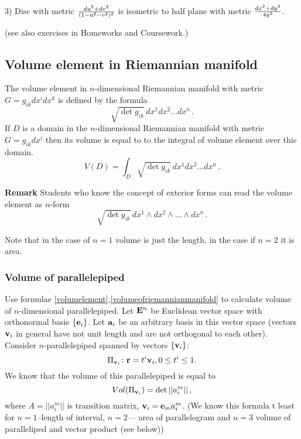\documentclass[12pt]{article}
\theoremstyle{theorem}
\numberwithin{equation}{section}
\begin{document}
{    3) Disc with metric $du^2+dv^2\over (1-u^2-v^2)^2$ is isometric to half plane with metric $dx^2+dy^2\over 4y^2$.

(see also exercises in Homeworks and Coursework.)





    \subsection {Volume element in Riemannian manifold}

   The volume element
in $n$-dimensional Riemannian manifold with metric $G=g_{ik}dx^i
    dx^k$ is defined by the formula
     \begin{equation}\label{volumelement}
  \sqrt {\det g_{ik}}\,dx^1dx^2\dots dx^n\,.
\end{equation}
    If $D$ is a domain in the $n$-dimensional Riemannian manifold with metric
    $G=g_{ik}dx^i$
    then its volume is equal to to the integral of volume element over this domain.
          \begin{equation}\label{volumeofriemannianmanifold}
  V(D)=\int_D \sqrt {\det g_{ik}}\,dx^1dx^2\dots dx^n\,.
\end{equation}

{\bf Remark} Students who know the concept of exterior forms
 can read the volume element as $n$-form
     \begin{equation*}\label{volumelement2}
  \sqrt {\det g_{ik}}\,dx^1\wedge dx^2\wedge \dots \wedge dx^n\,.
\end{equation*}

\bigskip

     Note that in the case of $n=1$ volume is just the length, in the case
     if $n=2$ it is area.

\subsubsection {Volume of parallelepiped}

  Use formulae \eqref{volumelement},\eqref{volumeofriemannianmanifold}
to calculate volume of $n$-dimensional parallelepiped.
   Let ${\bf E}^n$ be Euclidean
  vector space with orthonormal basis $\{{\bf e}_i\}$. Let
  ${{\bf a}_i}$ be an arbitrary basis in
this vector space (vectors ${\bf v}_i$ in general have not unit length and
  are not orthogonal to each other).
Consider $n$-parallelepiped spanned by vectors $\{{\bf v}_i\}$:
                 $$
     \Pi_{{\bf v}_i}\colon  {\bf r}=t^i{\bf v}_i, 0\leq t^i\leq 1.
                 $$
  We know that the volume of this parallelepiped is equal to
             \begin{equation}\label{parallelepipinn-dimspace1}
                Vol(\Pi_{{\bf v}_i})=\det ||a_i^m||\,,
             \end{equation}
where $A=||a_i^m||$ is  transition matrix, ${\bf v}_i={\bf e}_m a_i^m$.
(We know this formula t least for $n=1$--length of interval, $n=2$---
  area of parallelogram and $n=3$ volume of paralleliped
and vector product (see below))

}
\end{document}
